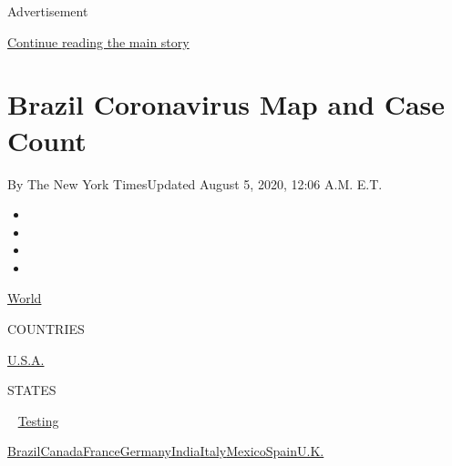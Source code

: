 Advertisement

\protect\hyperlink{after-top}{Continue reading the main story}

\hypertarget{brazil-coronavirus-map-and-case-count}{%
\section{Brazil Coronavirus Map and Case
Count}\label{brazil-coronavirus-map-and-case-count}}

By The New York TimesUpdated August 5, 2020, 12:06 A.M. E.T.

\begin{itemize}
\item
\item
\item
\item
\end{itemize}

\href{https://www.nytimes.com/interactive/2020/world/coronavirus-maps.html}{World}~

COUNTRIES

\textbar{}
\href{https://www.nytimes.com/interactive/2020/us/coronavirus-us-cases.html}{U.S.A.}~

STATES

~
\href{https://www.nytimes.com/interactive/2020/us/coronavirus-testing.html}{Testing}

\href{https://www.nytimes.com/interactive/2020/world/americas/brazil-coronavirus-cases.html}{Brazil}\href{https://www.nytimes.com/interactive/2020/world/canada/canada-coronavirus-cases.html}{Canada}\href{https://www.nytimes.com/interactive/2020/world/europe/france-coronavirus-cases.html}{France}\href{https://www.nytimes.com/interactive/2020/world/europe/germany-coronavirus-cases.html}{Germany}\href{https://www.nytimes.com/interactive/2020/world/asia/india-coronavirus-cases.html}{India}\href{https://www.nytimes.com/interactive/2020/world/europe/italy-coronavirus-cases.html}{Italy}\href{https://www.nytimes.com/interactive/2020/world/americas/mexico-coronavirus-cases.html}{Mexico}\href{https://www.nytimes.com/interactive/2020/world/europe/spain-coronavirus-cases.html}{Spain}\href{https://www.nytimes.com/interactive/2020/world/europe/united-kingdom-coronavirus-cases.html}{U.K.}

